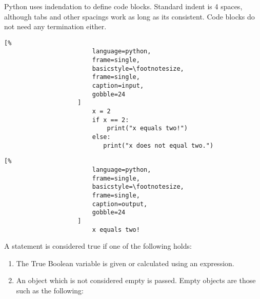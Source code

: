 \documentclass[crop=false,class=book]{standalone}
\begin{document}
                Python uses indendation to define code blocks.
                Standard indent is 4 spaces, although tabs and other
                spacings work as long as its consistent. Code blocks
                do not need any termination either.
                \newpage
                \begin{minipage}[t]{.48\textwidth}
                    \centering
                    \begin{lstlisting}[%
                        language=python,
                        frame=single,
                        basicstyle=\footnotesize,
                        frame=single,
                        caption=input,
                        gobble=24
                    ]
                        x = 2
                        if x == 2:
                            print("x equals two!")
                        else:
                           print("x does not equal two.")
                    \end{lstlisting}
                \end{minipage}\hfill
                \begin{minipage}[t]{.48\textwidth}
                    \centering
                    \begin{lstlisting}[%
                        language=python,
                        frame=single,
                        basicstyle=\footnotesize,
                        frame=single,
                        caption=output,
                        gobble=24
                    ]
                        x equals two!
                    \end{lstlisting}
                \end{minipage}\newline
                A statement is considered true if one of the
                following holds:
                \begin{enumerate}
                    \item The True Boolean variable is given or
                        calculated using an expression.
                    \item An object which is not considered empty is
                        passed. Empty objects are those such as the
                        following:
                    \begin{enumerate}
                    \end{enumerate}
                \end{enumerate}
\end{document}
